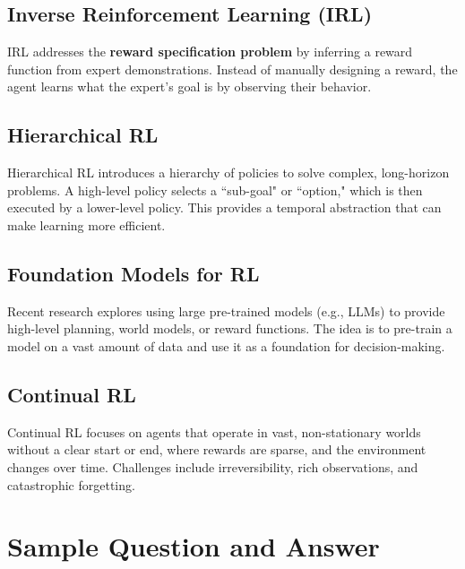 \documentclass[12pt]{article}
\begin{document}
\subsection{Inverse Reinforcement Learning (IRL)}
IRL addresses the \textbf{reward specification problem} by inferring a reward function from expert demonstrations. Instead of manually designing a reward, the agent learns what the expert's goal is by observing their behavior.

\subsection{Hierarchical RL}
Hierarchical RL introduces a hierarchy of policies to solve complex, long-horizon problems. A high-level policy selects a ``sub-goal" or ``option," which is then executed by a lower-level policy. This provides a temporal abstraction that can make learning more efficient.

\subsection{Foundation Models for RL}
Recent research explores using large pre-trained models (e.g., LLMs) to provide high-level planning, world models, or reward functions. The idea is to pre-train a model on a vast amount of data and use it as a foundation for decision-making.

\subsection{Continual RL}
Continual RL focuses on agents that operate in vast, non-stationary worlds without a clear start or end, where rewards are sparse, and the environment changes over time. Challenges include irreversibility, rich observations, and catastrophic forgetting.

\section{Sample Question and Answer}
\end{document}

